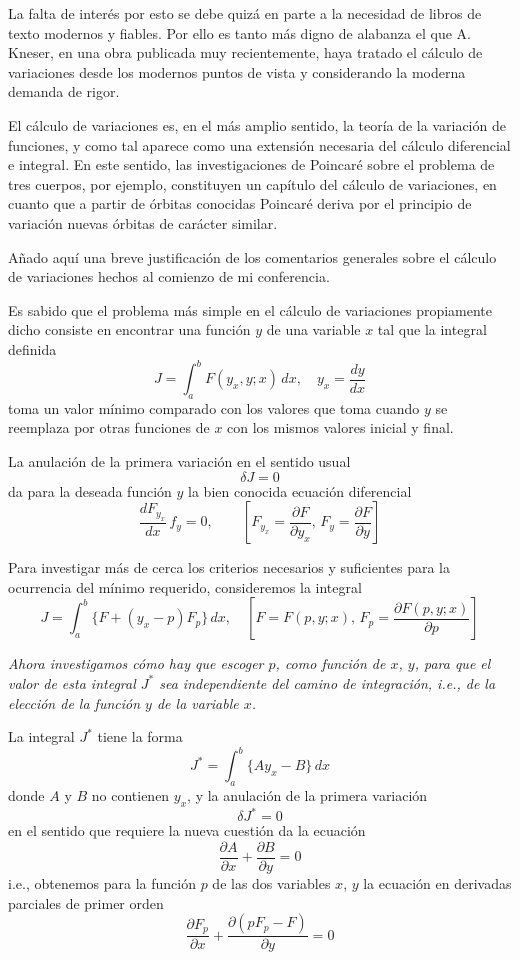 \documentclass[a4paper, 12pt]{article}
\begin{document}
{La falta de interés por esto se debe quizá en parte a la necesidad de libros de texto modernos y fiables. Por ello es tanto más digno de alabanza el que A. Kneser, en una obra publicada muy recientemente, haya tratado el cálculo de variaciones desde los modernos puntos de vista y considerando la moderna demanda de rigor.

El cálculo de variaciones es, en el más amplio sentido, la teoría de la variación de funciones, y como tal aparece como una extensión necesaria del cálculo diferencial e integral. En este sentido, las investigaciones de Poincaré sobre el problema de tres cuerpos, por ejemplo, constituyen un capítulo del cálculo de variaciones, en cuanto que a partir de órbitas conocidas Poincaré deriva por el principio de variación nuevas órbitas de carácter similar.

Añado aquí una breve justificación de los comentarios generales sobre el cálculo de variaciones hechos al comienzo de mi conferencia.

Es sabido que el problema más simple en el cálculo de variaciones propiamente dicho consiste en encontrar una función $y$ de una variable $x$ tal que la integral definida
$$
J=\int_a^b F(y_x,y;x)\, dx, \quad y_x= \frac{dy}{dx}
$$
toma un valor mínimo comparado con los valores que toma cuando $y$ se reemplaza por otras funciones de $x$ con los mismos valores inicial y final.

La anulación de la primera variación en el sentido usual
$$
\delta J=0
$$
da para la deseada función $y$ la bien conocida ecuación diferencial
\begin{equation}\label{1}
\frac{dF_{y_x}}{dx} \, f_y =0, \qquad \left[ F_{y_x}= \frac{\partial F}{\partial y_x}, \, F_y= \frac{\partial F}{\partial y}\right]
\end{equation}


Para investigar más de cerca los criterios necesarios y suficientes para la ocurrencia del mínimo requerido, consideremos la integral
$$
J=\int_a^b\{ F +(y_x-p)F_p\} \, dx, \quad  \left[F=F(p,y;x), \, F_p=\frac{\partial F(p,y;x)}{\partial p}\right]
$$



\textit{Ahora investigamos cómo hay que escoger $p$, como función de $x$, $y$,
para que el valor de esta integral $J^*$ sea independiente del camino de integración, i.e., de la elección de la función $y$ de la variable $x$.}

 La integral $J^*$ tiene la forma
$$
J^*=\int_a^b \{Ay_x-B\} \, dx
$$
donde $A$ y $B$ no contienen $y_x$, y la anulación de la primera variación
$$
\delta J^*=0
$$
en el sentido que requiere la nueva cuestión da la ecuación
$$
\frac{\partial A}{\partial x}+\frac{\partial B}{\partial y}=0
$$
i.e., obtenemos para la función $p$ de las dos variables $x$, $y$ la ecuación en derivadas parciales de primer orden
\begin{equation}\label{11}
\frac{\partial F_p}{\partial x}+ \frac{\partial (pF_p-F)}{\partial y}=0
\end{equation}


}
\end{document}
